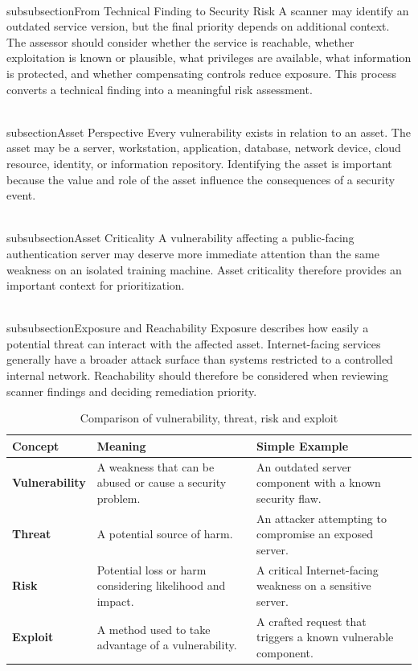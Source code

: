 \documentclass[11pt,a4paper]{article}
\begin{document}
\\subsubsection{From Technical Finding to Security Risk}
A scanner may identify an outdated service version, but the final priority depends on additional context. The assessor should consider whether the service is reachable, whether exploitation is known or plausible, what privileges are available, what information is protected, and whether compensating controls reduce exposure. This process converts a technical finding into a meaningful risk assessment.

\\subsection{Asset Perspective}
Every vulnerability exists in relation to an asset. The asset may be a server, workstation, application, database, network device, cloud resource, identity, or information repository. Identifying the asset is important because the value and role of the asset influence the consequences of a security event.

\\subsubsection{Asset Criticality}
A vulnerability affecting a public-facing authentication server may deserve more immediate attention than the same weakness on an isolated training machine. Asset criticality therefore provides an important context for prioritization.

\\subsubsection{Exposure and Reachability}
Exposure describes how easily a potential threat can interact with the affected asset. Internet-facing services generally have a broader attack surface than systems restricted to a controlled internal network. Reachability should therefore be considered when reviewing scanner findings and deciding remediation priority.

\begin{table}[H]\centering
\begin{tabularx}{\textwidth}{>{\bfseries}p{2.4cm}X X}
\toprule
Concept & Meaning & Simple Example\\
\midrule
Vulnerability & A weakness that can be abused or cause a security problem. & An outdated server component with a known security flaw.\\
Threat & A potential source of harm. & An attacker attempting to compromise an exposed server.\\
Risk & Potential loss or harm considering likelihood and impact. & A critical Internet-facing weakness on a sensitive server.\\
Exploit & A method used to take advantage of a vulnerability. & A crafted request that triggers a known vulnerable component.\\
\bottomrule
\end{tabularx}
\caption{Comparison of vulnerability, threat, risk and exploit}
\end{table}
\end{document}
